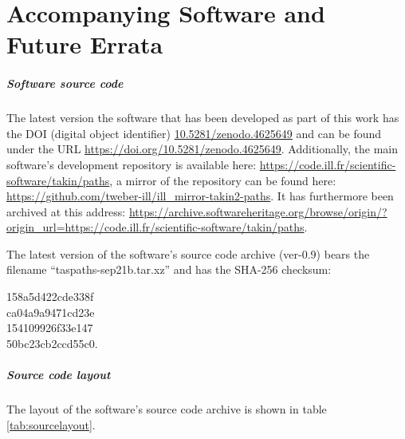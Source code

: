 %
%

\chapter{Accompanying Software and Future Errata}
\label{ch:online}

\paragraph{Software source code}
The latest version the software that has been developed 
as part of this work has the DOI (digital object identifier)
\href{https://doi.org/10.5281/zenodo.4625649}{10.5281/zenodo.4625649}
and can be found under the URL \url{https://doi.org/10.5281/zenodo.4625649}.
Additionally, the main software's development repository is available here: 
\url{https://code.ill.fr/scientific-software/takin/paths},
a mirror of the repository can be found here: 
\url{https://github.com/tweber-ill/ill_mirror-takin2-paths}.
It has furthermore been archived at this address:
\url{https://archive.softwareheritage.org/browse/origin/?origin_url=https://code.ill.fr/scientific-software/takin/paths}.

The latest version of the software's source code archive (ver-0.9) bears the 
filename ``taspaths-sep21b.tar.xz'' and has the SHA-256 \cite{web_sha256sum} 
checksum:

\begin{centering}
158a5d422cde338f\\
ca04a9a9471cd23e\\
154109926f33e147\\
50bc23cb2ccd55c0.\\
\end{centering}



\paragraph{Source code layout}
The layout of the software's source code archive is shown in table \ref{tab:sourcelayout}.

